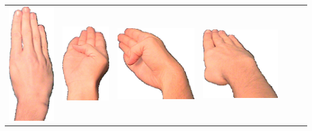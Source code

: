 \documentclass{article}
\begin{document}
\begin{center}
\begin{tabular}{r*{6}{c}}
\includegraphics[scale=0.1]{images/04-03-3.jpg}&
\includegraphics[scale=0.1]{images/04-03-4.jpg}&
\includegraphics[scale=0.1]{images/04-03-5.jpg}&
\includegraphics[scale=0.1]{images/04-03-6.jpg}\\

\end{tabular}
\end{center}
\end{document}
